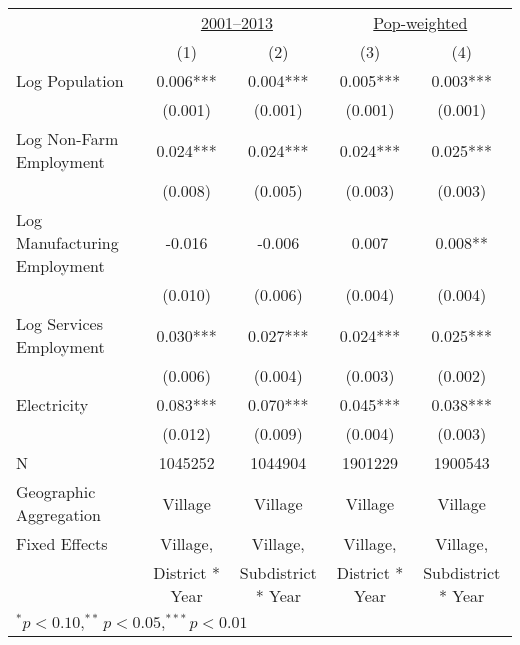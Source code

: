 \begin{tabular}{lcccc}
  \hline\hline
 & \multicolumn{2}{c}{\underline{2001--2013}} & \multicolumn{2}{c}{\underline{Pop-weighted}} \\
 & (1) & (2) & (3) & (4) \\
  
  \hline
Log Population & 0.006*** & 0.004*** & 0.005*** & 0.003*** \\
               & (0.001)     & (0.001)     & (0.001)     & (0.001)     \\

Log Non-Farm Employment & 0.024*** & 0.024*** & 0.024*** & 0.025*** \\
               & (0.008)     & (0.005)     & (0.003)     & (0.003)     \\

Log Manufacturing Employment & -0.016 & -0.006 & 0.007 & 0.008** \\
               & (0.010)     & (0.006)     & (0.004)     & (0.004)     \\

Log Services Employment & 0.030*** & 0.027*** & 0.024*** & 0.025*** \\
               & (0.006)     & (0.004)     & (0.003)     & (0.002)     \\

Electricity & 0.083*** & 0.070*** & 0.045*** & 0.038*** \\
               & (0.012)     & (0.009)     & (0.004)     & (0.003)     \\

\hline
N         & 1045252       & 1044904     & 1901229     & 1900543                          \\

Geographic Aggregation & Village         & Village            & Village         & Village            \\
Fixed Effects          & Village,        & Village,           & Village,        & Village,           \\
                       & District * Year & Subdistrict * Year & District * Year & Subdistrict * Year \\

\hline
\multicolumn{5}{l}{$^{*}p<0.10, ^{**}p<0.05, ^{***}p<0.01$} \\
\end{tabular}
